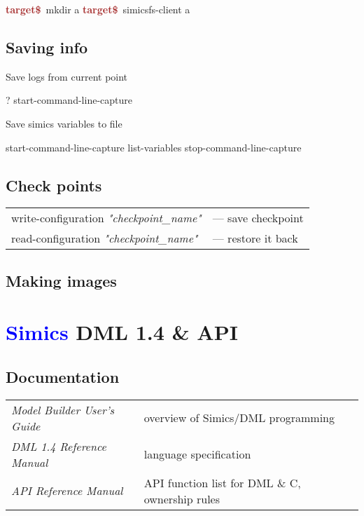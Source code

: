 \documentclass[8pt]{extarticle}
\newenvironment{code}[1][]{%
\begin{prebox}[#1]\obeylines}{%
\end{prebox}}
\newcommand{\cod}[1]{\colorbox{green!15}{#1}}
\newcommand{\tprompt}{\textcolor{brown}{\textbf{target\$}\ }}
\newcommand{\p}[1]{\textit{\large#1}}
\newcommand{\Simics}{\textcolor{blue}{Simics}}
\newlength{\MyLen}
\begin{document}
\begin{multicols*}{3}
\begin{code}[colback=blue!15]
\tprompt mkdir a
\tprompt simicsfs-client a
\end{code}

\subsection{Saving info}
Save logs from current point
\begin{code}
? start-command-line-capture
\end{code}

Save simics variables to file
\begin{code}
start-command-line-capture
list-variables
stop-command-line-capture
\end{code}

\subsection{Check points}
\begin{tabular}{ll}
            \cod{write-configuration \p{"checkpoint\_name"}} & — save
            checkpoint \\
            \cod{read-configuration \p{"checkpoint\_name"}} & — restore it back
\end{tabular}

\subsection{Making images}

\newpage

\section{\Simics{} DML 1.4 \& API}

\subsection{Documentation}
\begin{tabular}{p{\the\MyLen}p{\linewidth-\the\MyLen-0.8cm}}
    \textit{Model Builder User’s Guide} & overview of Simics/DML
    programming \\
    \textit{DML 1.4 Reference Manual} & language specification \\
    \textit{API Reference Manual} & API function list for DML \& C,
    ownership rules
\end{tabular}


\end{multicols*}
\end{document}
